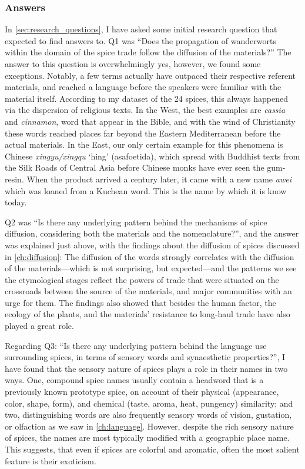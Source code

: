 \subsubsection{Answers}

In \cref{sec:research_questions}, I have asked some initial research question that expected to find answers to. Q1 was ``Does the propagation of \glspl{wanderwort} within the domain of the spice trade follow the diffusion of the materials?'' The answer to this question is overwhelmingly yes, however, we found some exceptions. Notably, a few terms actually have outpaced their respective referent materials, and reached a language before the speakers were familiar with the material itself. According to my dataset of the 24 spices, this always happened via the dispersion of religious texts. In the West, the best examples are \textit{cassia} and \textit{cinnamon}, word that appear in the Bible, and with the wind of Christianity these words reached places far beyond the Eastern Mediterranean before the actual materials. In the East, our only certain example for this phenomena is Chinese \textit{xingyu/xingqu} `hing' (asafoetida), which spread with Buddhist texts from the Silk Roads of Central Asia before Chinese monks have ever seen the gum-resin. When the product arrived a century later, it came with a new name \textit{awei} which was loaned from a Kuchean word. This is the name by which it is know today.

Q2 was ``Is there any underlying pattern behind the mechanisms of spice diffusion, considering both the materials and the nomenclature?'', and the answer was explained just above, with the findings about the diffusion of spices discussed in \cref{ch:diffusion}: The diffusion of the words strongly correlates with the diffusion of the materials---which is not surprising, but expected---and the patterns we see the etymological stages reflect the powers of trade that were situated on the crossroads between the source of the materials, and major communities with an urge for them. The findings also showed that besides the human factor, the ecology of the plants, and the materials' resistance to long-haul trade have also played a great role.

Regarding Q3: ``Is there any underlying pattern behind the language use surrounding spices, in terms of sensory words and synaesthetic properties?'', I have found that the sensory nature of spices plays a role in their names in two ways. One, compound spice names usually contain a headword that is a previously known prototype spice, on account of their physical (appearance, color, shape, form), and chemical (taste, aroma, heat, pungency) similarity; and two, distinguishing words are also frequently sensory words of vision, gustation, or olfaction as we saw in \cref{ch:language}. However, despite the rich sensory nature of spices, the names are most typically modified with a geographic place name. This suggests, that even if spices are colorful and aromatic, often the most salient feature is their exoticism.
    
